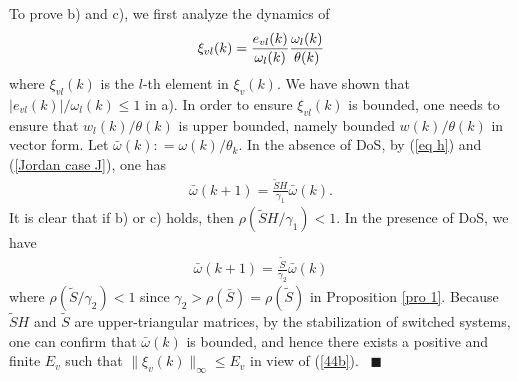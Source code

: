 \documentclass{autart}
\def\qedp{\hspace*{\fill}~{\tiny $\blacksquare$}}
\def\qedp{\hspace*{\fill}~{\tiny $\blacksquare$}}
\begin{document}
To prove b) and c), we first analyze the dynamics of  
\begin{align}\label{44b}
\xi_{vl}(k) 
=\frac{e_{vl}(k)}{\omega_l(k)} \frac{\omega_l(k)}{\theta(k)} 
\vspace{-2mm}
\end{align}
where $\xi_{vl}(k) $ is the $l$-th element in $\xi_{v}(k) $.
We have shown that $|e_{vl}(k)|/\omega_l(k) \le 1 $ in a). In order to ensure $ \xi_{vl}(k)$ is bounded, one needs to ensure that $w_l(k)/\theta(k)$ is upper bounded, namely bounded $w(k)/\theta(k)$ in vector form. Let $\bar \omega(k) : = \omega(k)/\theta_k$. In the absence of DoS, by (\ref{eq h}) and (\ref{Jordan case J}), one has
\begin{align}\label{eq 43}
\bar \omega(k+1) =\frac{ \tilde S  H}{\gamma_1} \bar \omega(k).
\end{align}
It is clear that if b) or c) holds, then $\rho(\tilde S H  /\gamma_1)<1$. In the presence of DoS, we have 
\begin{align}\label{44}
\bar \omega(k+1) =\frac{  \tilde S}{\gamma_2}\bar \omega(k)
\end{align}
where $\rho(\tilde S    /\gamma_2) < 1$ since $\gamma_2 > \rho(\bar S)= \rho(\tilde S)$ in Proposition \ref{pro 1}. Because $\tilde S H$ and $\tilde S$ are upper-triangular matrices, by the stabilization of switched systems, one can confirm that $\bar \omega(k)$ is bounded, and hence there exists a positive and finite $E_v$ such that $\|\xi_v(k)\|_\infty  \le E_v$ in view of (\ref{44b}). 
\qedp
\end{document}
